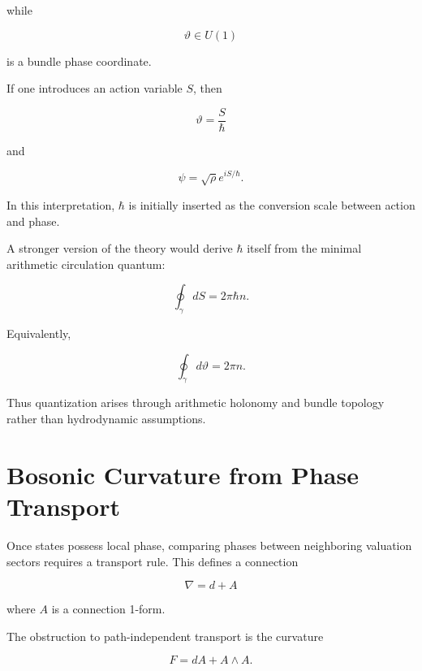 \documentclass[11pt]{article}
\begin{document}
while

\begin{equation}
\vartheta
\in U(1)
\end{equation}

is a bundle phase coordinate.

If one introduces an action variable $S$, then

\begin{equation}
\vartheta = \frac{S}{\hbar}
\end{equation}

and

\begin{equation}
\psi = \sqrt{\rho} e^{iS/\hbar}.
\end{equation}

In this interpretation, $\hbar$ is initially inserted as the conversion scale between action and phase.

A stronger version of the theory would derive $\hbar$ itself from the minimal arithmetic circulation quantum:

\begin{equation}
\oint_\gamma dS
=
2\pi \hbar n.
\end{equation}

Equivalently,

\begin{equation}
\oint_\gamma d\vartheta
=
2\pi n.
\end{equation}

Thus quantization arises through arithmetic holonomy and bundle topology rather than hydrodynamic assumptions.

\section{Bosonic Curvature from Phase Transport}

Once states possess local phase, comparing phases between neighboring valuation sectors requires a transport rule. This defines a connection

\begin{equation}
\nabla = d + A
\end{equation}

where $A$ is a connection 1-form.

The obstruction to path-independent transport is the curvature

\begin{equation}
F = dA + A \wedge A.
\end{equation}
\end{document}
